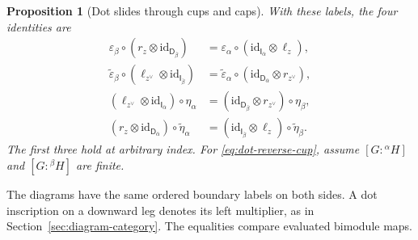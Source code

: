 \documentclass[11pt,a4paper]{article}
\numberwithin{equation}{section}
\newtheorem{proposition}[theorem]{Proposition}
\theoremstyle{definition}
\newcommand{\id}{\mathrm{id}}
\newcommand{\cg}[2]{{}^{#1}\!#2}
\newcommand{\I}{\mathsf I}
\newcommand{\D}{\mathsf D}
\newcommand{\ev}{\varepsilon}
\newcommand{\tv}{\widetilde{\varepsilon}}
\newcommand{\tu}{\widetilde{\eta}}
\begin{document}
\begin{proposition}[Dot slides through cups and caps]\label{prop:cup-cap-dots}
With these labels, the four identities are
\begin{align}
 \ev_\beta\circ(r_z\otimes\id_{\D_{\bar\beta}})
   &=\ev_\alpha\circ(\id_{\I_{\bar\alpha}}\otimes\ell_z),
       \label{eq:dot-multiplication-cap}\\
 \tv_\beta\circ(\ell_{z^\vee}\otimes\id_{\I_{\bar\beta}})
   &=\tv_\alpha\circ(\id_{\D_{\bar\alpha}}\otimes r_{z^\vee}),
       \label{eq:dot-trace-cap}\\
 (\ell_{z^\vee}\otimes\id_{\I_{\bar\alpha}})\circ\eta_\alpha
   &=(\id_{\D_{\bar\beta}}\otimes r_{z^\vee})\circ\eta_\beta,
       \label{eq:dot-ordinary-cup}\\
 (r_z\otimes\id_{\D_{\bar\alpha}})\circ\tu_\alpha
   &=(\id_{\I_{\bar\beta}}\otimes\ell_z)\circ\tu_\beta.
       \label{eq:dot-reverse-cup}
\end{align}
The first three hold at arbitrary index. For
\eqref{eq:dot-reverse-cup}, assume
\([G:\cg{\alpha}{H}]\) and \([G:\cg{\beta}{H}]\) are finite.
\end{proposition}

The diagrams have the same ordered boundary labels on both sides.
A dot inscription on a downward leg denotes its left multiplier,
as in Section~\ref{sec:diagram-category}. The equalities compare
 evaluated bimodule maps.
\end{document}
